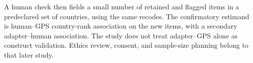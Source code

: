 A human check then fields a small number of retained and flagged items in a predeclared set of countries, using the same recodes. The confirmatory estimand is human--GPS country-rank association on the new items, with a secondary adapter--human association. The study does not treat adapter--GPS alone as construct validation. Ethics review, consent, and sample-size planning belong to that later study.
